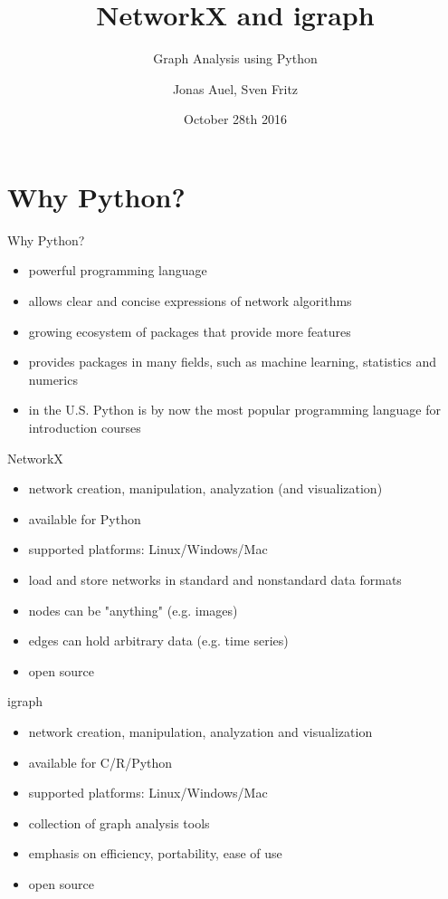 \documentclass[12pt]{beamer}
\author{Jonas Auel, Sven Fritz}
\title{NetworkX and igraph}
\subtitle{Graph Analysis using Python}
\institute{Uni Mannheim}
\date{October 28th 2016}
\begin{document}
	\maketitle
	\section{Why Python?}
	\begin{frame}{Why Python?}
		\begin{itemize}
			\item powerful programming language
			\item allows clear and concise expressions of network algorithms
			\item growing ecosystem of packages that provide more features
			\item provides packages in many fields, such as machine learning, statistics and numerics
			\item in the U.S. Python is by now the most popular programming language for introduction courses
		\end{itemize}
	\end{frame}
	\begin{frame}{NetworkX}
		\begin{itemize}
			\item network creation, manipulation, analyzation (and visualization)
			\item available for Python
			\item supported platforms: Linux/Windows/Mac
			\item load and store networks in standard and nonstandard data formats
			\item nodes can be "anything" (e.g. images)
			\item edges can hold arbitrary data (e.g. time series)
			\item open source
		\end{itemize}
	\end{frame}
	\begin{frame}{igraph}
		\begin{itemize}
			\item network creation, manipulation, analyzation and visualization
			\item available for C/R/Python
			\item supported platforms: Linux/Windows/Mac 
			\item collection of graph analysis tools
			\item emphasis on efficiency, portability, ease of use
			\item open source
		\end{itemize}
	\end{frame}
\end{document}
